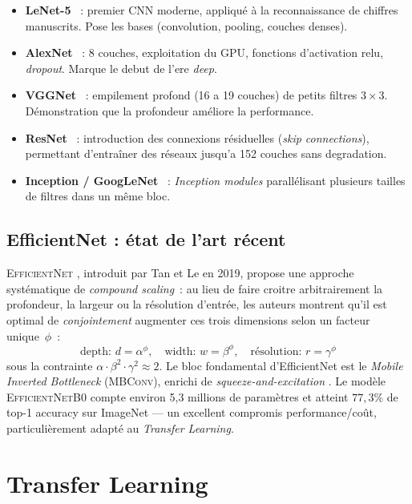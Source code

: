 \documentclass[12pt,a4paper,openany]{report}
\begin{document}
\begin{itemize}
    \item \textbf{LeNet-5} \cite{lecun1998}~: premier CNN moderne, appliqué à la reconnaissance de chiffres manuscrits. Pose les bases (convolution, pooling, couches denses).
    \item \textbf{AlexNet} \cite{krizhevsky2012}~: 8 couches, exploitation du GPU, fonctions d'activation \gls{relu}, \emph{dropout}. Marque le debut de l'ere \emph{deep}.
    \item \textbf{VGGNet} \cite{simonyan2014}~: empilement profond (16 a 19 couches) de petits filtres $3\times 3$. Démonstration que la profondeur améliore la performance.
    \item \textbf{ResNet} \cite{he2016}~: introduction des connexions résiduelles (\emph{skip connections}), permettant d'entraîner des réseaux jusqu'a 152 couches sans degradation.
    \item \textbf{Inception / GoogLeNet} \cite{szegedy2015}~: \emph{Inception modules} parallélisant plusieurs tailles de filtres dans un même bloc.
\end{itemize}

\subsection{EfficientNet : état de l'art récent}

\textsc{EfficientNet} \cite{tan2019efficientnet}, introduit par Tan et Le en 2019, propose une approche systématique de \emph{compound scaling}~: au lieu de faire croitre arbitrairement la profondeur, la largeur ou la résolution d'entrée, les auteurs montrent qu'il est optimal de \emph{conjointement} augmenter ces trois dimensions selon un facteur unique~$\phi$~:
\begin{equation}
    \text{depth: } d = \alpha^\phi, \quad
    \text{width: } w = \beta^\phi, \quad
    \text{résolution: } r = \gamma^\phi
\end{equation}
sous la contrainte $\alpha\cdot\beta^2\cdot\gamma^2 \approx 2$. Le bloc fondamental d'EfficientNet est le \emph{Mobile Inverted Bottleneck} (\textsc{MBConv}), enrichi de \emph{squeeze-and-excitation} \cite{hu2018}. Le modèle \textsc{EfficientNetB0} compte environ 5{,}3 millions de paramètres et atteint $77{,}3\%$ de top-1 accuracy sur ImageNet --- un excellent compromis performance/coût, particulièrement adapté au \emph{Transfer Learning}.

\section{Transfer Learning}
\end{document}
